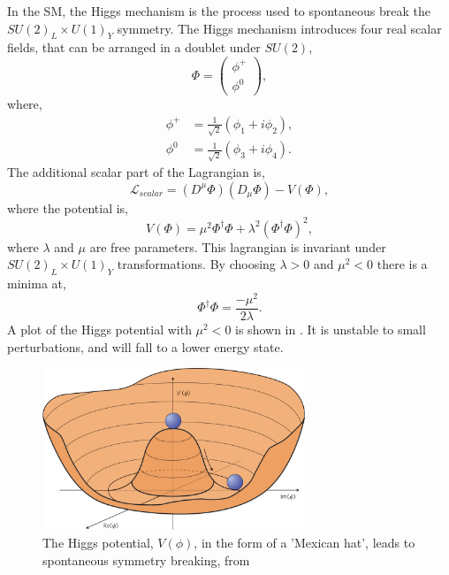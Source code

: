 In the \ac{SM}, the Higgs mechanism is the process used to spontaneous break the
 $SU(2)_{L} \times U(1)_{Y}$ symmetry.
The Higgs mechanism introduces four real scalar fields, that can be arranged in a
doublet under $SU(2)$,
\begin{equation}
\Phi = \left( \begin{matrix} \phi^{+} \\ \phi^{0} \end{matrix} \right),
\end{equation}
where,
\begin{align*}
\phi^{+} &=\frac{1}{\sqrt{2}} (\phi_{1} + i \phi_{2}),\\
\phi^{0} &=\frac{1}{\sqrt{2}} (\phi_{3} + i \phi_{4}).
\end{align*}
The additional scalar part of the Lagrangian is,
\begin{equation}
\mathcal{L}_{scalar} = 
\left(D^{\mu}\Phi\right) \left(D_{\mu}\Phi\right) - V(\Phi),
\end{equation}
where the potential is,
\begin{equation}
V(\Phi) = 
\mu^{2}\Phi^{\dagger}\Phi + 
\lambda^{2} \left( \Phi^{\dagger} \Phi \right)^{2},
\end{equation}
where $\lambda$ and $\mu$ are free parameters. This lagrangian is invariant
under $SU(2)_{L} \times U(1)_{Y}$ transformations.
By choosing  $\lambda>0$ and
$\mu^{2}<0$ there is a minima at,
\begin{equation}
\Phi^{\dagger} \Phi = \frac{- \mu^{2}}{2 \lambda}.
\end{equation}
A plot of the Higgs potential with $\mu^{2}<0$ is shown in
. It is unstable to small perturbations, and will fall
to a lower energy state. 

\begin{figure}[htbp]
  \centering
  \includegraphics[width=0.7\textwidth]{nphys1874-f1.jpg}
  \caption{ The Higgs potential, $V(\phi)$, in the form of a 'Mexican hat',
leads to spontaneous symmetry breaking, from \cite{}}
  \label{fig:higgspot}
\end{figure}

